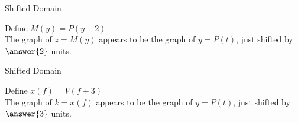 \documentclass{ximera}
\begin{document}
\begin{exercise}
\begin{question} Shifted Domain 

Define $M(y) = P(y - 2)$ \\



The graph of $z = M(y)$ appears to be the graph of $y = P(t)$, just shifted  by $\answer{2}$ units.


\end{question}















\begin{question} Shifted Domain 

Define $x(f) = V(f + 3)$ \\


The graph of $k = x(f)$ appears to be the graph of $y = P(t)$, just shifted  by $\answer{3}$ units.


\end{question}







\end{exercise}
\end{document}
